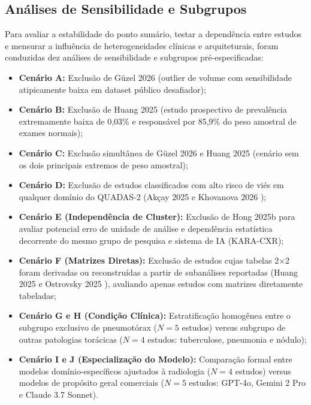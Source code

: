 \documentclass[12pt,a4paper]{article}
\begin{document}
\subsection{Análises de Sensibilidade e Subgrupos}
Para avaliar a estabilidade do ponto sumário, testar a dependência entre estudos e mensurar a influência de heterogeneidades clínicas e arquiteturais, foram conduzidas dez análises de sensibilidade e subgrupos pré-especificadas:
\begin{itemize}
    \item \textbf{Cenário A:} Exclusão de Güzel 2026 \cite{guzel} (outlier de volume com sensibilidade atipicamente baixa em dataset público desafiador);
    \item \textbf{Cenário B:} Exclusão de Huang 2025 \cite{huang2025} (estudo prospectivo de prevalência extremamente baixa de 0,03\% e responsável por 85,9\% do peso amostral de exames normais);
    \item \textbf{Cenário C:} Exclusão simultânea de Güzel 2026 e Huang 2025 (cenário sem os dois principais extremos de peso amostral);
    \item \textbf{Cenário D:} Exclusão de estudos classificados com alto risco de viés em qualquer domínio do QUADAS-2 (Akçay 2025 \cite{akcay} e Khovanova 2026 \cite{khovanova});
    \item \textbf{Cenário E (Independência de Cluster):} Exclusão de Hong 2025b \cite{hong2025b} para avaliar potencial erro de unidade de análise e dependência estatística decorrente do mesmo grupo de pesquisa e sistema de IA (KARA-CXR);
    \item \textbf{Cenário F (Matrizes Diretas):} Exclusão de estudos cujas tabelas 2$\times$2 foram derivadas ou reconstruídas a partir de subanálises reportadas (Huang 2025 \cite{huang2025} e Ostrovsky 2025 \cite{ostrovsky}), avaliando apenas estudos com matrizes diretamente tabeladas;
    \item \textbf{Cenário G e H (Condição Clínica):} Estratificação homogênea entre o subgrupo exclusivo de pneumotórax ($N=5$ estudos) versus subgrupo de outras patologias torácicas ($N=4$ estudos: tuberculose, pneumonia e nódulo);
    \item \textbf{Cenário I e J (Especialização do Modelo):} Comparação formal entre modelos domínio-específicos ajustados à radiologia ($N=4$ estudos) versus modelos de propósito geral comerciais ($N=5$ estudos: GPT-4o, Gemini 2 Pro e Claude 3.7 Sonnet).
\end{itemize}
\end{document}
